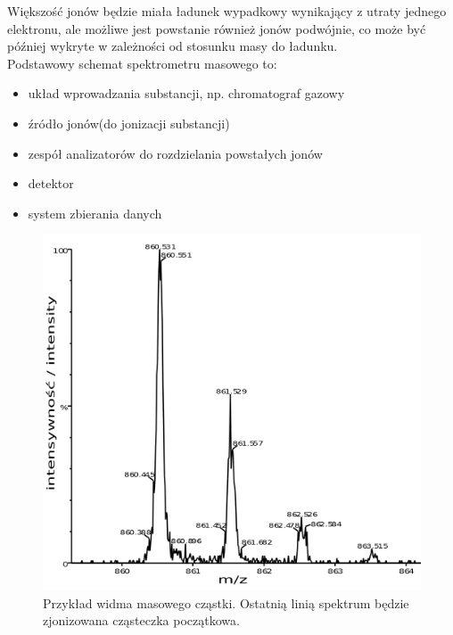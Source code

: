 \documentclass[paper=a4, fontsize=12pt]{scrartcl}
\begin{document}
Większość jonów będzie miała ładunek wypadkowy wynikający z utraty jednego elektronu, ale możliwe jest powstanie również jonów podwójnie, co może być później wykryte w zależności od stosunku masy do ładunku.\\

Podstawowy schemat spektrometru masowego to:
\begin{itemize}
	\item układ wprowadzania substancji, np. chromatograf gazowy
	\item źródło jonów(do jonizacji substancji)
	\item zespół analizatorów do rozdzielania powstałych jonów
	\item detektor
	\item system zbierania danych
\end{itemize}
\begin{figure}[h!]
	\centering
	\includegraphics[width=0.5\linewidth]{mspek}
	\caption{Przykład widma masowego cząstki. Ostatnią linią spektrum będzie zjonizowana cząsteczka początkowa.}
	\label{fig:mspek}
\end{figure}
\end{document}
